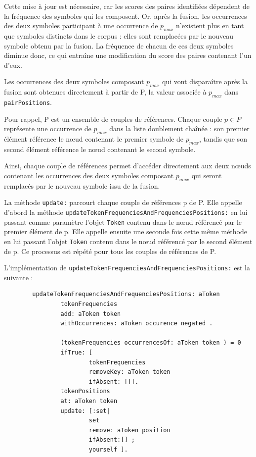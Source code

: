 \documentclass[12pt,a4paper]{report}
\begin{document}
\begin{enumerate}
\begin{enumerate}[label=\alph*)]
	 	Cette mise à jour est nécessaire, car les scores des paires identifiées dépendent de la fréquence des symboles qui les composent. Or, après la fusion, les occurrences des deux symboles participant à une occurrence de $p_{max}$ n'existent plus en tant que symboles distincts dans le corpus : elles sont remplacées par le nouveau symbole obtenu par la fusion. La fréquence de chacun de ces deux symboles diminue donc, ce qui entraîne une modification du score des paires contenant l'un d'eux.
	 	
	 	Les occurrences des deux symboles composant $p_{max}$ qui vont disparaître après la fusion sont obtenues directement à partir de P, la valeur associée à $p_{max}$ dans \texttt{pairPositions}.
	 	
	 	Pour rappel, P est un ensemble de couples de références. Chaque couple $p \in P$ représente une occurrence de $p_{max}$ dans la liste doublement chaînée : son premier élément référence le nœud contenant le premier symbole de $p_{max}$, tandis que son second élément référence le nœud contenant le second symbole.
	 	
	 	Ainsi, chaque couple de références permet d'accéder directement aux deux nœuds contenant les occurrences des deux symboles composant $p_{max}$ qui seront remplacés par le nouveau symbole issu de la fusion.
	 	
	 	La méthode \texttt{update:} parcourt chaque couple de références p de P. Elle appelle d'abord la méthode \texttt{updateTokenFrequenciesAndFrequenciesPositions:} en lui passant comme paramètre l'objet \texttt{Token} contenu dans le nœud référencé par le premier élément de p. Elle appelle ensuite une seconde fois cette même méthode en lui passant l'objet \texttt{Token} contenu dans le nœud référencé par le second élément de p. Ce processus est répété pour tous les couples de références de P.
	 	
	 	L'implémentation de \texttt{updateTokenFrequenciesAndFrequenciesPositions:} est la suivante :
	 	
	 	\begin{verbatim}
	 	updateTokenFrequenciesAndFrequenciesPositions: aToken
	 			tokenFrequencies
	 			add: aToken token
	 			withOccurrences: aToken occurence negated .
	 			
	 			(tokenFrequencies occurrencesOf: aToken token ) = 0
	 			ifTrue: [
	 					tokenFrequencies
	 					removeKey: aToken token
	 					ifAbsent: []].
	 			tokenPositions
	 			at: aToken token
	 			update: [:set|
	 					set
	 					remove: aToken position
	 					ifAbsent:[] ;
	 					yourself ].
	 					

\end{verbatim}
\end{enumerate}
\end{enumerate}
\end{document}
